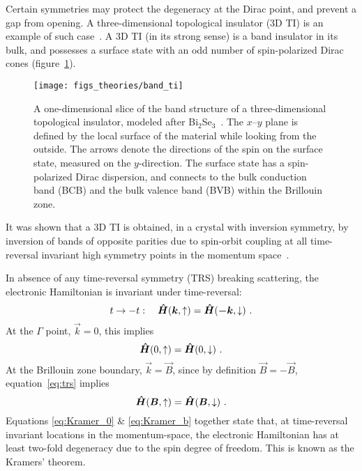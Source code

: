Certain symmetries may protect the degeneracy at the Dirac point, and prevent a gap from opening. A three-dimensional topological insulator (3D TI) is an example of such case~\cite{TI_Qi, TI_Col}. A 3D TI (in its strong sense) is a band insulator in its bulk, and possesses a surface state with an odd number of spin-polarized Dirac cones (figure~\ref{fig:bg_ti}). %
\begin{figure}[ht]%
    \centering%
    \texttt{[image: figs\_theories/band\_ti]}%
    \caption[Band structure of a 3D topological insulator]{\label{fig:bg_ti}A one-dimensional slice of the band structure of a three-dimensional topological insulator, modeled after Bi$_2$Se$_3$~\cite{TI_electronic_structure_zhang}. The $x$--$y$ plane is defined by the local surface of the material while looking from the outside. The arrows denote the directions of the spin on the surface state, measured on the $y$-direction. The surface state has a spin-polarized Dirac dispersion, and connects to the bulk conduction band (BCB) and the bulk valence band (BVB) within the Brillouin zone.}%
\end{figure}%
%
It was shown that a 3D TI is obtained, in a crystal with inversion symmetry, by inversion of bands of opposite parities due to spin-orbit coupling at all time-reversal invariant high symmetry points in the momentum space~\cite{Fu2007}.

In absence of any time-reversal symmetry (TRS) breaking scattering, the electronic Hamiltonian is invariant under time-reversal:%
\begin{equation}%
    t \to -t: \quad \op{H}(\vec{k}, \uparrow) = \op{H}(\vec{-k}, \downarrow)~.\label{eq:trs}%
\end{equation}%
At the $\Gamma$ point, $\vec{k}=0$, this implies%
\begin{equation}%
    \op{H}(0, \uparrow) = \op{H}(0, \downarrow)~.\label{eq:Kramer_0}%
\end{equation}%
At the Brillouin zone boundary, $\vec{k} = \vec{B}$, since by definition $\vec{B} = -\vec{B}$, equation~\ref{eq:trs} implies%
\begin{equation}%
    \op{H}(\vec{B}, \uparrow) = \op{H}(\vec{B}, \downarrow)~.\label{eq:Kramer_b}%
\end{equation}%
Equations \ref{eq:Kramer_0} \& \ref{eq:Kramer_b} together state that, at time-reversal invariant locations in the momentum-space, the electronic Hamiltonian has at least two-fold degeneracy due to the spin degree of freedom. This is known as the Kramers' theorem.

